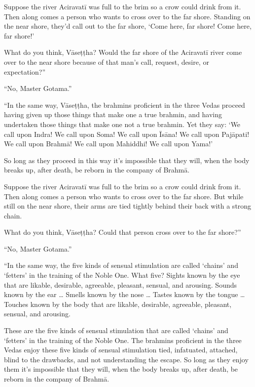 \documentclass[12pt,openany]{book}%
\begin{document}
Suppose the river \textsanskrit{Aciravatī} was full to the brim so a crow could drink from it. Then along comes a person who wants to cross over to the far shore. Standing on the near shore, they’d call out to the far shore, ‘Come here, far shore! Come here, far shore!’ 

What do you think, \textsanskrit{Vāseṭṭha}? Would the far shore of the \textsanskrit{Aciravatī} river come over to the near shore because of that man’s call, request, desire, or expectation?” 

“No, Master Gotama.” 

“In the same way, \textsanskrit{Vāseṭṭha}, the brahmins proficient in the three Vedas proceed having given up those things that make one a true brahmin, and having undertaken those things that make one not a true brahmin. Yet they say: ‘We call upon Indra! We call upon Soma! We call upon \textsanskrit{Īsāna}! We call upon \textsanskrit{Pajāpati}! We call upon \textsanskrit{Brahmā}! We call upon Mahiddhi! We call upon Yama!’ 

So long as they proceed in this way it’s impossible that they will, when the body breaks up, after death, be reborn in the company of \textsanskrit{Brahmā}. 

Suppose the river \textsanskrit{Aciravatī} was full to the brim so a crow could drink from it. Then along comes a person who wants to cross over to the far shore. But while still on the near shore, their arms are tied tightly behind their back with a strong chain. 

What do you think, \textsanskrit{Vāseṭṭha}? Could that person cross over to the far shore?” 

“No, Master Gotama.” 

“In the same way, the five kinds of sensual stimulation are called ‘chains’ and ‘fetters’ in the training of the Noble One. What five? Sights known by the eye that are likable, desirable, agreeable, pleasant, sensual, and arousing. Sounds known by the ear … Smells known by the nose … Tastes known by the tongue … Touches known by the body that are likable, desirable, agreeable, pleasant, sensual, and arousing. 

These are the five kinds of sensual stimulation that are called ‘chains’ and ‘fetters’ in the training of the Noble One. The brahmins proficient in the three Vedas enjoy these five kinds of sensual stimulation tied, infatuated, attached, blind to the drawbacks, and not understanding the escape. So long as they enjoy them it’s impossible that they will, when the body breaks up, after death, be reborn in the company of \textsanskrit{Brahmā}. 
\end{document}
